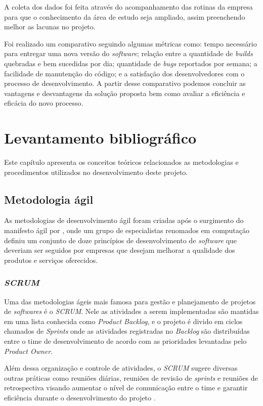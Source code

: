 \documentclass[
	12pt,				%
	openright,			%
	oneside,			%
	a4paper,			%
	english,			%
	french,				%
	spanish,			%
	brazil,				%
	]{abntex2}
\begin{document}
A coleta dos dados foi feita através do acompanhamento das rotinas da empresa para que o conhecimento da área de estudo seja ampliado, assim preenchendo melhor as lacunas no projeto.

Foi realizado um comparativo seguindo algumas métricas como: tempo necessário para entregar uma nova versão do \textit{software}; relação entre a quantidade de \textit{builds} quebradas e bem sucedidas por dia; quantidade de \textit{bugs} reportados por semana; a facilidade de manutenção do código; e a satisfação dos desenvolvedores com o processo de desenvolvimento. A partir desse comparativo podemos concluir as vantagens e desvantagens da solução proposta bem como avaliar a eficiência e eficácia do novo processo.

\chapter{Levantamento bibliográfico}

Este capítulo apresenta os conceitos teóricos relacionados as metodologias e procedimentos utilizados no desenvolvimento deste projeto.

\section{Metodologia ágil}

As metodologias de desenvolvimento ágil foram criadas após o surgimento do manifesto ágil por , onde um grupo de especialistas renomados em computação definiu um conjunto de doze princípios de desenvolvimento de \textit{software} que deveriam ser seguidos por empresas que desejam melhorar a qualidade dos produtos e serviços oferecidos.

\subsection{\textit{SCRUM}}

Uma das metodologias ágeis mais famosa para gestão e planejamento de projetos de \textit{softwares} é o \textit{SCRUM}. Nele as atividades a serem implementadas são mantidas em uma lista conhecida como \textit{Product Backlog}, e o projeto é divido em ciclos chamados de \textit{Sprints} onde as atividades registradas no \textit{Backlog} são distribuídas entre o time de desenvolvimento de acordo com as prioridades levantadas pelo \textit{Product Owner}.

Além dessa organização e controle de atividades, o \textit{SCRUM} sugere diversas outras práticas como reuniões diárias, reuniões de revisão de \textit{sprints} e reuniões de retrospectiva visando aumentar o nível de comunicação entre o time e garantir eficiência durante o desenvolvimento do projeto \cite{Agil:SCRUM}.
\end{document}
